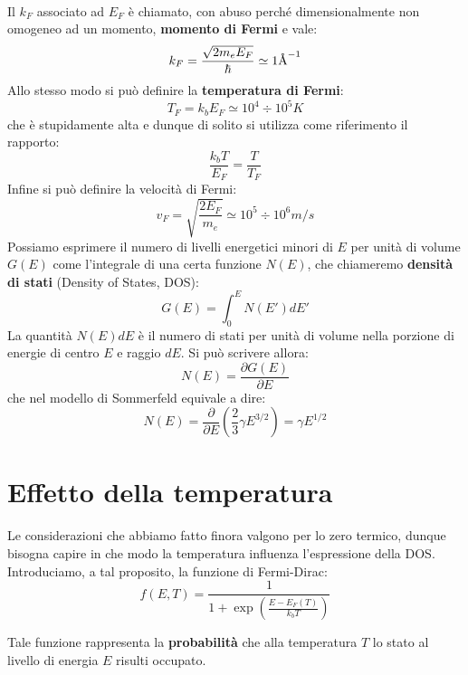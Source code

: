 \documentclass{book}
\begin{document}
            \paragraph{}
                Il $k_{F}$ associato ad $E_{F}$ è chiamato, con abuso perché dimensionalmente non omogeneo ad un momento, \textbf{momento di Fermi} e vale:
                $$k_{F} = \frac{\sqrt{2m_{e}E_{F}}}{\hbar} \simeq 1 \textrm{\si{\angstrom}} ^{-1}$$
                Allo stesso modo si può definire la \textbf{temperatura di Fermi}:
                $$T_{F} = k_{b}E_{F} \simeq 10^{4} \div 10^{5}  K$$
                che è stupidamente alta e dunque di solito si utilizza come riferimento il rapporto:
                $$\frac{k_{b}T}{E_{F}} = \frac{T}{T_{F}}$$
                Infine si può definire la velocità di Fermi:
                $$v_{F} = \sqrt{\frac{2E_{F}}{m_{e}}} \simeq 10^{5} \div 10^{6} m/s$$
                Possiamo esprimere il numero di livelli energetici minori di $E$ per unità di volume $G(E)$ come l'integrale di una certa funzione $N(E)$, che chiameremo \textbf{densità di stati} (Density of States, DOS):
                $$G(E)  = \int_{0} ^{E} N(E')dE'$$
                La quantità $N(E)dE$ è il numero di stati per unità di volume nella porzione di energie di centro $E$ e raggio $dE$.\newline
                Si può scrivere allora:
                $$N(E) = \frac{\partial G(E)}{\partial E}$$
                che nel modello di Sommerfeld equivale a dire:
                $$N(E) = \frac{\partial}{\partial E} (\frac{2}{3}\gamma E^{3/2}) = \gamma E^{1/2}$$
            \newpage
    \section{Effetto della temperatura}
        \paragraph{}
            Le considerazioni che abbiamo fatto finora valgono per lo zero termico, dunque bisogna capire in che modo la temperatura influenza l'espressione della DOS. Introduciamo, a tal proposito, la funzione di Fermi-Dirac:
            $$f(E, T) = \frac{1}{1+\exp{(\frac{E-E_{F}(T)}{k_{b}T})}}$$

            Tale funzione rappresenta la \textbf{probabilità} che alla temperatura $T$ lo stato al livello di energia $E$ risulti occupato.
            
\end{document}
